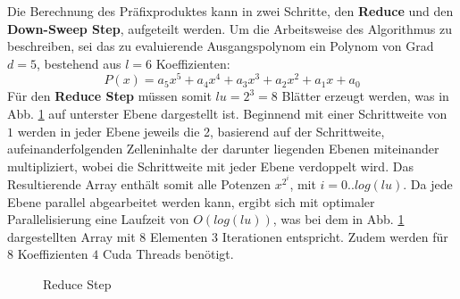 Die Berechnung des Präfixproduktes kann in zwei Schritte, den \textbf{Reduce} und den \textbf{Down-Sweep Step}, aufgeteilt werden. Um die Arbeitsweise des Algorithmus zu beschreiben, sei das zu evaluierende Ausgangspolynom ein Polynom von Grad $d = 5$, bestehend aus $l = 6$ Koeffizienten:
$$P(x) = a_5x^5 + a_4x^4 + a_3x^3 + a_2x^2 + a_1x +a_0$$ 
Für den \textbf{Reduce Step} müssen somit $lu = 2^3 = 8$ Blätter erzeugt werden, was in Abb. \ref{fig:reduce_step} auf unterster Ebene dargestellt ist. Beginnend mit einer Schrittweite von $1$ werden in jeder Ebene jeweils die 2, basierend auf der Schrittweite, aufeinanderfolgenden Zelleninhalte der darunter liegenden Ebenen miteinander multipliziert, wobei die Schrittweite mit jeder Ebene verdoppelt wird. Das Resultierende Array enthält somit alle Potenzen $x^{2^i}$, mit $i=0..log(lu)$. Da jede Ebene parallel abgearbeitet werden kann, ergibt sich mit optimaler Parallelisierung eine Laufzeit von $O(log(lu))$, was bei dem in Abb. \ref{fig:reduce_step} dargestellten Array mit $8$ Elementen $3$ Iterationen entspricht. Zudem werden für $8$ Koeffizienten $4$ Cuda Threads benötigt.\newline

\begin{figure}
\centering

\caption{Reduce Step} \label{fig:reduce_step}
\end{figure}

